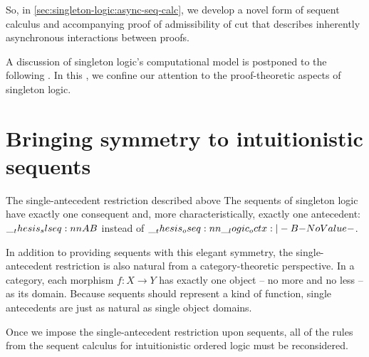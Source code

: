 So, in \cref{sec:singleton-logic:async-seq-calc}, we develop a novel form of sequent calculus and accompanying proof of admissibility of cut that describes inherently asynchronous interactions between proofs.

A discussion of singleton logic's computational model is postponed to the following .
In this , we confine our attention to the proof-theoretic aspects of singleton logic.





\section{Bringing symmetry to intuitionistic sequents}\label{sec:singleton-logic:derive}

The single-antecedent restriction described above
The sequents of singleton logic have exactly one consequent and, more characteristically, exactly one antecedent: $\slseq{A |- B}$ instead of $\oseq{\octx |- B}$.

In addition to providing sequents with this elegant symmetry, the single-antecedent restriction is also natural from a category-theoretic perspective.
In a category, each morphism $f\colon X \rightarrow Y$ has exactly one object -- no more and no less -- as its domain.
Because sequents should represent a kind of function, single antecedents are just as natural as single object domains.

Once we impose the single-antecedent restriction upon sequents, all of the rules from the sequent calculus for intuitionistic ordered logic must be reconsidered.

